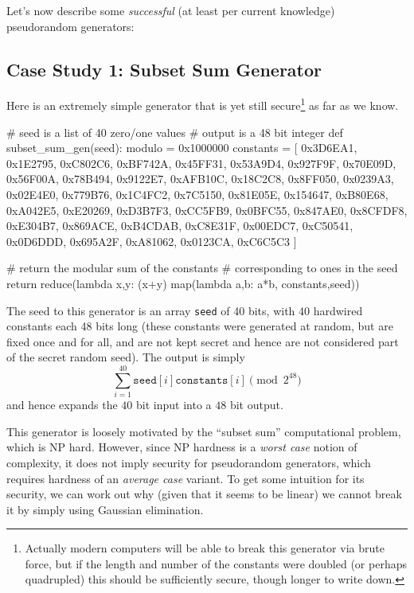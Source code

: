 Let's now describe some \emph{successful} (at least per current
knowledge) pseudorandom generators:

\subsection{Case Study 1: Subset Sum
Generator}\label{3-Case-Study--Subset-Sum}

Here is an extremely simple generator that is yet still
secure\footnote{Actually modern computers will be able to break this
  generator via brute force, but if the length and number of the
  constants were doubled (or perhaps quadrupled) this should be
  sufficiently secure, though longer to write down.} as far as we know.

\begin{code}
# seed is a list of 40 zero/one values
# output is a 48 bit integer
def subset_sum_gen(seed):
  modulo = 0x1000000
  constants = [  
     0x3D6EA1, 0x1E2795, 0xC802C6, 0xBF742A, 0x45FF31,  
     0x53A9D4, 0x927F9F, 0x70E09D, 0x56F00A, 0x78B494,  
     0x9122E7, 0xAFB10C, 0x18C2C8, 0x8FF050, 0x0239A3,  
     0x02E4E0, 0x779B76, 0x1C4FC2, 0x7C5150, 0x81E05E,  
     0x154647, 0xB80E68, 0xA042E5, 0xE20269, 0xD3B7F3,  
     0xCC5FB9, 0x0BFC55, 0x847AE0, 0x8CFDF8, 0xE304B7,  
     0x869ACE, 0xB4CDAB, 0xC8E31F, 0x00EDC7, 0xC50541,  
     0x0D6DDD, 0x695A2F, 0xA81062, 0x0123CA, 0xC6C5C3 ]

  # return the modular sum of the constants
  # corresponding to ones in the seed
  return reduce(lambda x,y: (x+y) %
                map(lambda a,b: a*b, constants,seed))
\end{code}

The seed to this generator is an array \texttt{seed} of 40 bits, with 40
hardwired constants each 48 bits long (these constants were generated at
random, but are fixed once and for all, and are not kept secret and
hence are not considered part of the secret random seed). The output is
simply
\begin{equation*}
\sum_{i=1}^{40} \texttt{seed}[i]\texttt{constants}[i] \pmod{2^{48}}
\end{equation*}
and hence expands the \(40\) bit input into a \(48\) bit output.

This generator is loosely motivated by the ``subset sum'' computational
problem, which is NP hard. However, since NP hardness is a \emph{worst
case} notion of complexity, it does not imply security for pseudorandom
generators, which requires hardness of an \emph{average case} variant.
To get some intuition for its security, we can work out why (given that
it seems to be linear) we cannot break it by simply using Gaussian
elimination.

